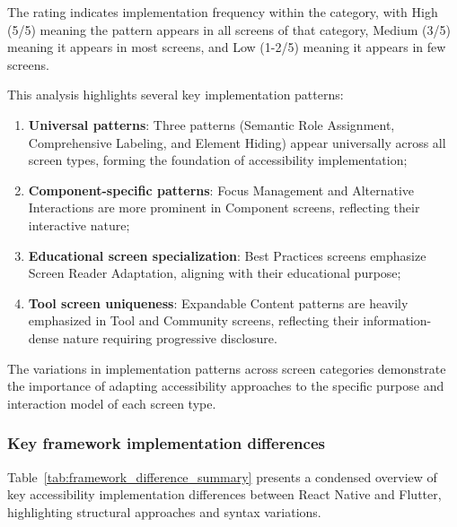 The rating indicates implementation frequency within the category, with High (5/5) meaning the pattern appears in all screens of that category, Medium (3/5) meaning it appears in most screens, and Low (1-2/5) meaning it appears in few screens.

This analysis highlights several key implementation patterns:

\begin{enumerate}
    \item \textbf{Universal patterns}: Three patterns (Semantic Role Assignment, Comprehensive Labeling, and Element Hiding) appear universally across all screen types, forming the foundation of accessibility implementation;
    
    \item \textbf{Component-specific patterns}: Focus Management and Alternative Interactions are more prominent in Component screens, reflecting their interactive nature;
    
    \item \textbf{Educational screen specialization}: Best Practices screens emphasize Screen Reader Adaptation, aligning with their educational purpose;
    
    \item \textbf{Tool screen uniqueness}: Expandable Content patterns are heavily emphasized in Tool and Community screens, reflecting their information-dense nature requiring progressive disclosure.
\end{enumerate}

The variations in implementation patterns across screen categories demonstrate the importance of adapting accessibility approaches to the specific purpose and interaction model of each screen type.

\subsubsection{Key framework implementation differences}

Table~\ref{tab:framework_difference_summary} presents a condensed overview of key accessibility implementation differences between React Native and Flutter, highlighting structural approaches and syntax variations.

